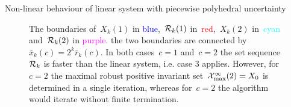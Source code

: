 \begin{example}{Non-linear behaviour of linear system with piecewise polyhedral uncertainty}
\begin{figure}
\caption[Convergence of the auxiliary set~$\R_k$]{The boundaries of~$X_k(1)$ in \textcolor{blue}{blue},~$\mathcal R_k(1)$ in~\textcolor{red}{red},~$X_k(2)$ in~\textcolor{cyan}{cyan} and~$\mathcal R_k(2)$ in \textcolor{magenta}{purple}. the two boundaries are connected by~$\bar x_k(c)=2^k\bar r_k(c)$.
%
In both cases~$c=1$ and~$c=2$ the set sequence~$\R_k$ is faster than the linear system, i.e. case 3 applies. 
%
However, for~$c=2$ the maximal robust positive invariant set~$\mathcal X^\infty_{\max}(2)=X_0$ is determined in a single iteration, whereas for~$c=2$ the algorithm would iterate without finite termination.}
\end{figure}

\end{example}
%
%
